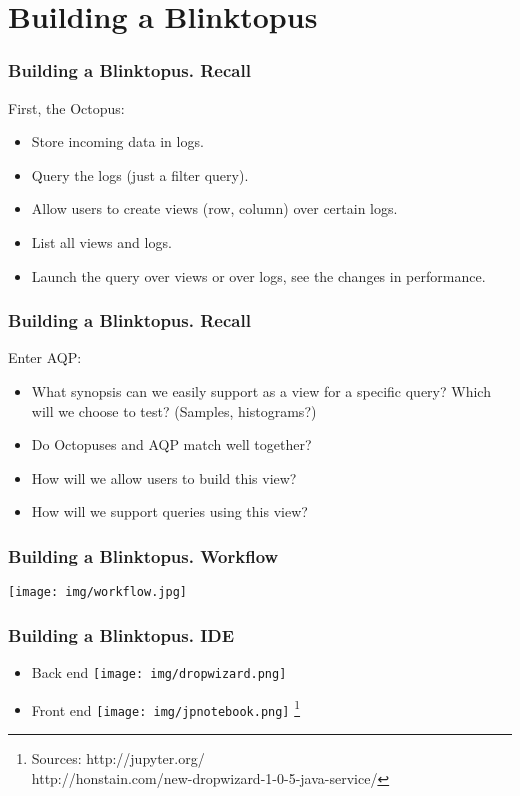 \documentclass{beamer}
\begin{document}
\section{Building a Blinktopus}
\begin{frame}
\frametitle{Building a Blinktopus. Recall}
First, the Octopus:
\begin{itemize}
\item{Store incoming data in logs.}
\item{Query the logs (just a filter query).}
\item{Allow users to create views (row, column) over certain logs.}
\item{List all views and logs.}
\item{Launch the query over views or over logs, see the changes in performance.}
\end{itemize}
\end{frame}
\begin{frame}
\frametitle{Building a Blinktopus. Recall}
Enter AQP:
\begin{itemize}
\item{What synopsis can we easily support as a view for a specific query? Which will we choose to test? (Samples, histograms?)}
\item{Do Octopuses and AQP match well together?}
\item{How will we allow users to build this view?}
\item{How will we support queries using this view?}\\
\end{itemize}
\end{frame}


\begin{frame}
\frametitle{Building a Blinktopus. Workflow}
\texttt{[image: img/workflow.jpg]}
\end{frame}

\begin{frame}
\frametitle{Building a Blinktopus. IDE}
\begin{itemize}
\item{Back end}
\texttt{[image: img/dropwizard.png]}
\vspace{0.25 cm}
\item{Front end}
\texttt{[image: img/jpnotebook.png]}
\footnote{\tiny 
Sources: http://jupyter.org/\\
http://honstain.com/new-dropwizard-1-0-5-java-service/}
\end{itemize}
\end{frame}
\end{document}

